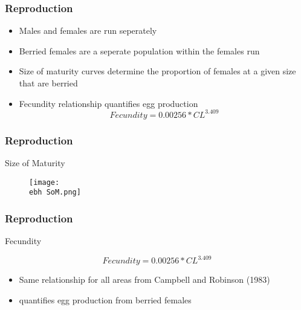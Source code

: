 \documentclass{beamer}
\newcommand{\ebh}{\string~/bio.data/bio.lobster/figures/LFA3438Framework2019/} %
\begin{document}
\begin{frame}
\frametitle{Reproduction}
\begin{itemize}
\item Males and females are run seperately
\item Berried females are a seperate population within the females run
\item Size of maturity curves determine the proportion of females at a given size that are berried
\item Fecundity relationship quantifies egg production
\begin{equation*}
Fecundity = 0.00256 * CL^3.409
\end{equation*}
\end{itemize}
\end{frame}


\begin{frame}
\frametitle{Reproduction}
Size of Maturity
\begin{figure}
        \begin{center}
            \texttt{[image: \\ebh SoM.png]}
        \end{center}
    \end{figure}
\end{frame}


\begin{frame}
\frametitle{Reproduction}
Fecundity

\begin{equation*}
Fecundity = 0.00256 * CL^3.409
\end{equation*}

\begin{itemize}
\item Same relationship for all areas from Campbell and Robinson (1983)
\item quantifies egg production from berried females
\end{itemize}
\end{frame}
\end{document}
